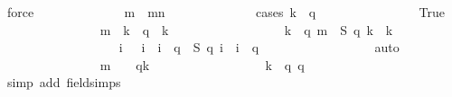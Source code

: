\begin{isabellebody}
\ force\isanewline
\ \ \ \ \ \ \ \ \ \ \ \ \isamarkupfalse%
\ {\isachardoublequoteopen}m{\isacharprime}\ {\isasymge}\ {\isacharquery}mn{\isachardoublequoteclose}\isanewline
\ \ \ \ \ \ \ \ \ \ \ \ \isamarkupfalse%
\ {\isacharparenleft}cases\ {\isachardoublequoteopen}k\ {\isasymle}\ q{\isachardoublequoteclose}{\isacharparenright}\isanewline
\ \ \ \ \ \ \ \ \ \ \ \ \ \ \isamarkupfalse%
\ True\isanewline
\ \ \ \ \ \ \ \ \ \ \ \ \ \ \isamarkupfalse%
\ {\isachardoublequoteopen}m{\isacharprime}\ {\isacharequal}\ {\isacharparenleft}k\ {\isacharminus}\ {}{\isacharslash}q{\isacharparenright}\ {\isacharslash}\ k{\isachardoublequoteclose}\isanewline
\ \ \ \ \ \ \ \ \ \ \ \ \ \ \ \ \isamarkupfalse%
\ {\isacharbackquoteopen}k\ {\isasymin}\ {\isacharbraceleft}{}{\isachardot}{\isachardot}{\isacharless}q{\isacharplus}{}{\isacharplus}{}{\isacharbraceright}{\isacharbackquoteclose}\ {\isacharbackquoteopen}m{\isacharprime}\ {\isacharequal}\ {\isacharquery}S\ {\isacharparenleft}q{\isacharplus}{}{\isacharparenright}\ k\ {\isacharslash}\ k{\isacharbackquoteclose}\ \isanewline
\ \ \ \ \ \ \ \ \ \ \ \ \ \ \ \ \isamarkupfalse%
\ {\isacharbackquoteopen}{\isasymforall}\ i{\isachardot}\ {}\ {\isasymle}\ i\ {\isasymand}\ i\ {\isasymle}\ q\ {\isasymlongrightarrow}\ {\isacharquery}S\ {\isacharparenleft}q{\isacharplus}{}{\isacharparenright}\ i\ {\isacharequal}\ i\ {\isacharminus}\ {}{\isacharslash}q{\isacharbackquoteclose}\isanewline
\ \ \ \ \ \ \ \ \ \ \ \ \ \ \ \ \isamarkupfalse%
\ auto\isanewline
\ \ \ \ \ \ \ \ \ \ \ \ \ \ \isamarkupfalse%
\ {\isachardoublequoteopen}m{\isacharprime}\ {\isacharequal}\ {}\ {\isacharminus}\ {}{\isacharslash}{\isacharparenleft}q{\isacharasterisk}k{\isacharparenright}{\isachardoublequoteclose}\isanewline
\ \ \ \ \ \ \ \ \ \ \ \ \ \ \ \ \isamarkupfalse%
\ {\isacharbackquoteopen}k\ {\isasymin}\ {\isacharbraceleft}{}{\isachardot}{\isachardot}{\isacharless}q{\isacharplus}{}{\isacharplus}{}{\isacharbraceright}{\isacharbackquoteclose}\ {\isacharbackquoteopen}q\ {\isasymge}\ {}{\isacharbackquoteclose}\isanewline
\ \ \ \ \ \ \ \ \ \ \ \ \ \ \ \ \isamarkupfalse%
\ {\isacharparenleft}simp\ add{\isacharcolon}\ field{\isacharunderscore}simps{\isacharparenright}\isanewline
\ \ \ \ \ \ \ \ \ \ \ \ \ \ \isamarkupfalse%

\end{isabellebody}

